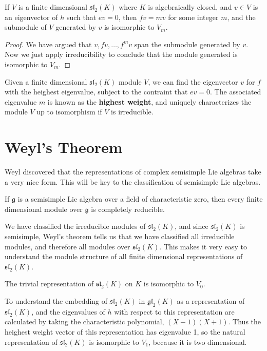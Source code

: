 \begin{corollary}
    If $V$ is a finite dimensional $\mathfrak{sl}_2(K)$ where $K$ is algebraically closed, and $v \in V$ is an eigenvector of $h$ such that $ev = 0$, then $fv = mv$ for some integer $m$, and the submodule of $V$ generated by $v$ is isomorphic to $V_m$.
\end{corollary}
\begin{proof}
    We have argued that $v, fv, \dots, f^m v$ span the submodule generated by $v$. Now we just apply irreducibility to conclude that the module generated is isomorphic to $V_m$.
\end{proof}

Given a finite dimensional $\mathfrak{sl}_2(K)$ module $V$, we can find the eigenvector $v$ for $f$ with the heighest eigenvalue, subject to the contraint that $ev = 0$. The associated eigenvalue $m$ is known as the {\bf highest weight}, and uniquely characterizes the module $V$ up to isomorphism if $V$ is irreducible.

\section{Weyl's Theorem}

Weyl discovered that the representations of complex semisimple Lie algebras take a very nice form. This will be key to the classification of semisimple Lie algebras.

\begin{theorem}[Weyl]
    If $\mathfrak{g}$ is a semisimple Lie algebra over a field of characteristic zero, then every finite dimensional module over $\mathfrak{g}$ is completely reducible.
\end{theorem}

We have classified the irreducible modules of $\mathfrak{sl}_2(K)$, and since $\mathfrak{sl}_2(K)$ is semisimple, Weyl's theorem tells us that we have classified all irreducible modules, and therefore all modules over $\mathfrak{sl}_2(K)$. This makes it very easy to understand the module structure of all finite dimensional representations of $\mathfrak{sl}_2(K)$.

\begin{example}
    The trivial representation of $\mathfrak{sl}_2(K)$ on $K$ is isomorphic to $V_0$.
\end{example}

\begin{example}
    To understand the embedding of $\mathfrak{sl}_2(K)$ in $\mathfrak{gl}_2(K)$ as a representation of $\mathfrak{sl}_2(K)$, and the eigenvalues of $h$ with respect to this representation are calculated by taking the characteristic polynomial, $(X - 1)(X + 1)$. Thus the heighest weight vector of this representation has eigenvalue 1, so the natural representation of $\mathfrak{sl}_2(K)$ is isomorphic to $V_1$, because it is two dimensional.
\end{example}

